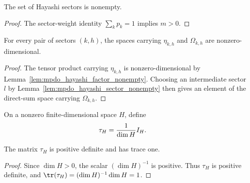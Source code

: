 \begin{lemma}
    \label{lem:mpdo_hayashi_sector_nonempty}
    \leanok
    The set of Hayashi sectors is nonempty.
\end{lemma}
\begin{proof}
    \leanok
    The sector-weight identity $\sum_k p_k=1$ implies $m>0$.
\end{proof}

\begin{lemma}
    \label{lem:mpdo_hayashi_auxiliary_nonempty}
    \leanok
    For every pair of sectors $(k,h)$, the spaces carrying
    $\eta_{k,h}$ and $\Omega_{k,h}$ are nonzero-dimensional.
\end{lemma}
\begin{proof}
    \leanok
    The tensor product carrying $\eta_{k,h}$ is nonzero-dimensional by
    Lemma~\ref{lem:mpdo_hayashi_factor_nonempty}. Choosing an intermediate
    sector $l$ by Lemma~\ref{lem:mpdo_hayashi_sector_nonempty} then gives
    an element of the direct-sum space carrying $\Omega_{k,h}$.
\end{proof}

\begin{definition}
    \label{def:mpdo_faithful_uniform_density}
    \leanok
    On a nonzero finite-dimensional space $H$, define
    \begin{align}
        \tau_H & =\frac{1}{\dim H}I_H. \notag
    \end{align}
\end{definition}

\begin{lemma}
    \label{thm:mpdo_faithful_uniform_density}
    \leanok
    The matrix $\tau_H$ is positive definite and has trace one.
\end{lemma}
\begin{proof}
    \leanok
    Since $\dim H>0$, the scalar $(\dim H)^{-1}$ is positive. Thus
    $\tau_H$ is positive definite, and
    $\tr(\tau_H)=(\dim H)^{-1}\dim H=1$.
\end{proof}

